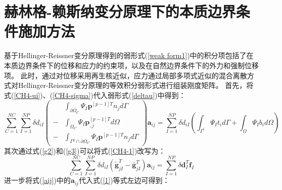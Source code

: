 \section{赫林格-赖斯纳变分原理下的本质边界条件施加方法}
基于Hellinger-Reissner变分原理得到的弱形式(\ref{weak form1})中的积分项包括了在本质边界条件下的位移和应力的约束项，以及在自然边界条件下的外力和强制位移项。
此时，通过对位移采用再生核近似，应力通过局部多项式近似的混合离散方式对Hellinger-Reissner变分原理的等效积分弱形式进行组装刚度矩阵。
首先，将式(\ref{CH4-ui})、(\ref{CH4-sigma})代入弱形式(\ref{deltau})中得到：
\begin{equation}\label{CH4-1}
\sum_{C=1}^{N\!C}\sum_{I=1}^{N\!P}\delta d_{iI} \left (
        \begin{split}
        &\int_{\partial\Omega_C}\Psi_I\pmb{p}^{[p-1]T}n_jd\Gamma \\
        -&\int_{\Omega_C}\Psi_I\pmb{p}_{,j}^{[p-1]T}d\Omega \\
        -&\int_{\Gamma^g\cap\partial\Omega_C}\Psi_I\pmb{p}^{[p-1]T}n_jd\Gamma
        \end{split}
        \right )\pmb{a}_{ij}=
\sum_{I=1}^{N\!P}\delta d_{iI}(\int_{\Gamma^t}\Psi_It_id\Gamma+\int_{\Omega}\Psi_Ib_id\Omega)
\end{equation}
其次通过式(\ref{g2})和(\ref{g3})可以将式(\ref{CH4-1})改写为：
\begin{equation}\label{1}
    \sum_{C=1}^{N\!C}\sum_{I=1}^{N\!P}\delta d_{iI}(\tilde{\pmb g}_{jI}^T-\bar{\pmb g}_{jI}^T)\pmb{a}_{ij}=\sum_{I=1}^{N\!P}\delta\pmb{d}_I^T\pmb{f}_I
\end{equation}
进一步将式(\ref{aij})中的$\pmb{a}_{ij}$代入式(\ref{1})等式左边可得到：
\newpage
